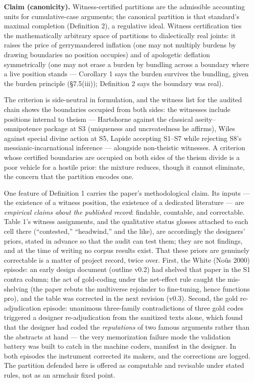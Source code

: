 \textbf{Claim (canonicity).} Witness-certified partitions are the admissible accounting units for cumulative-case arguments; the canonical partition is that standard's maximal completion (Definition 2), a regulative ideal. Witness certification ties the mathematically arbitrary space of partitions to dialectically real joints: it raises the price of gerrymandered inflation (one may not multiply burdens by drawing boundaries no position occupies) and of apologetic deflation symmetrically (one may not erase a burden by bundling across a boundary where a live position stands --- Corollary 1 says the burden survives the bundling, given the burden principle (\S{}7.5(iii)); Definition 2 says the boundary was real).

The criterion is side-neutral in formulation, and the witness list for the audited chain shows the boundaries occupied from both sides: the witnesses include positions internal to theism --- Hartshorne against the classical aseity--omnipotence package at S3 (uniqueness and uncreatedness he affirms), Wiles against special divine action at S5, Lapide accepting S1--S7 while rejecting S8's messianic-incarnational inference --- alongside non-theistic witnesses. A criterion whose certified boundaries are occupied on both sides of the theism divide is a poor vehicle for a hostile prior: the mixture reduces, though it cannot eliminate, the concern that the partition encodes one.

One feature of Definition 1 carries the paper's methodological claim. Its inputs --- the existence of a witness position, the existence of a dedicated literature --- are \emph{empirical claims about the published record}: findable, countable, and correctable. Table 1's witness assignments, and the qualitative status glosses attached to each cell there (``contested,'' ``headwind,'' and the like), are accordingly the designers' priors, stated in advance so that the audit can test them; they are not findings, and at the time of writing no corpus results exist. That these priors are genuinely correctable is a matter of project record, twice over. First, the White (Noûs 2000) episode: an early design document (outline v0.2) had shelved that paper in the S1 contra column; the act of gold-coding under the net-effect rule caught the mis-shelving (the paper rebuts the multiverse rejoinder to fine-tuning, hence functions pro), and the table was corrected in the next revision (v0.3). Second, the gold re-adjudication episode: unanimous three-family contradictions of three gold codes triggered a designer re-adjudication from the sanitized texts alone, which found that the designer had coded the \emph{reputations} of two famous arguments rather than the abstracts at hand --- the very memorization failure mode the validation battery was built to catch in the machine coders, manifest in the designer. In both episodes the instrument corrected its makers, and the corrections are logged. The partition defended here is offered as computable and revisable under stated rules, not as an armchair fixed point.


